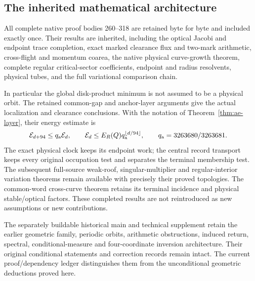 \subsection*{The inherited mathematical architecture}
All complete native proof bodies 260--318 are retained byte for byte
and included exactly once. Their results are inherited, including
the optical Jacobi and endpoint trace completion, exact marked
clearance flux and two-mark arithmetic, cross-flight and momentum
coarea, the native physical curve-growth theorem, complete regular
critical-sector coefficients, endpoint and radius resolvents,
physical tubes, and the full variational comparison chain.

In particular the global disk-product minimum is not assumed to be
a physical orbit. The retained common-gap and anchor-layer arguments
give the actual localization and clearance conclusions. With the
notation of Theorem~\ref{thm:ae-layer}, their energy estimate is
\begin{equation}\label{eq:ae-intro}
 \mathcal E_{d+94}\le q_{\rm a}\mathcal E_d,\qquad
 \mathcal E_d\le E_R(Q)q_{\rm a}^{\lfloor d/94\rfloor},\qquad
 q_{\rm a}=3263680/3263681.
\end{equation}
The exact physical clock keeps its endpoint work; the central record
transport keeps every original occupation test and separates the
terminal membership test. The subsequent full-source weak-roof,
singular-multiplier and regular-interior variation theorems remain
available with precisely their proved topologies. The common-word
cross-curve theorem retains its terminal incidence and physical
stable/optical factors. These completed results are not reintroduced
as new assumptions or new contributions.

The separately buildable historical main and technical supplement
retain the earlier geometric family, periodic orbits, arithmetic
obstructions, induced return, spectral, conditional-measure and
four-coordinate inversion architecture. Their original conditional
statements and correction records remain intact. The current
proof/dependency ledger distinguishes them from the unconditional
geometric deductions proved here.
